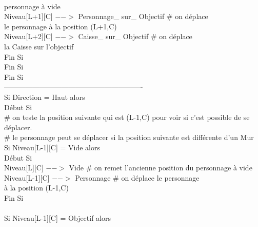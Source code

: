 \documentclass{article}
\begin{document}
\begin{tabbing}
\\ \hspace{5cm} personnage à vide
\\	\hspace{5cm}			Niveau[L+1][C] $-->$ Personnage\_ sur\_ Objectif     \# on déplace
\\ \hspace{5cm} le personnage à la position (L+1,C)
\\	\hspace{5cm}			Niveau[L+2][C] $-->$ Caisse\_ sur\_ Objectif		\# on déplace
\\ \hspace{5cm} la Caisse sur l'objectif
\\	\hspace{4cm}		Fin Si
\\	\hspace{3cm}	Fin Si 
\\	\hspace{2cm}   Fin Si 
\\	----------------------------------------------------------
\\	\hspace{2cm} Si Direction = Haut alors
\\	\hspace{2cm} Début Si
\\	\hspace{3cm}	\# on teste la position suivante qui est (L-1,C)	pour voir si c'est possible de se déplacer.
\\	\hspace{3cm}	\# le personnage peut se déplacer si la position suivante est différente d'un Mur		\\	\hspace{3cm}	Si Niveau[L-1][C] = Vide alors			
\\	\hspace{3cm}	Début Si
\\	\hspace{4cm}		Niveau[L][C] $-->$ Vide 		\# on remet l'ancienne position du personnage à vide
\\	\hspace{4cm}		Niveau[L-1][C] $-->$ Personnage	\# on déplace le personnage
\\ \hspace{4cm} à la position (L-1,C)
\\	\hspace{3cm}	Fin Si 
\\		
\\	\hspace{3cm}	Si Niveau[L-1][C] = Objectif alors			

\end{tabbing}
\end{document}
